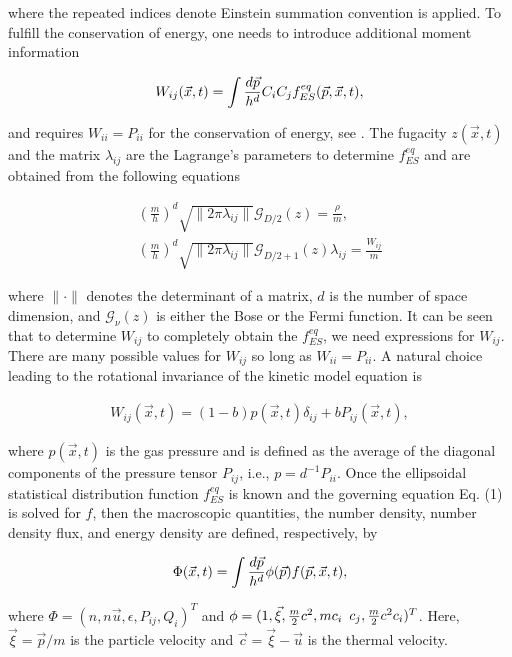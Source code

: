 \documentclass[doublecol]{epl2}
\begin{document}
where the repeated indices denote Einstein summation convention is applied. To fulfill the conservation of energy, one needs to introduce additional moment information

\begin{align}
W_{i j}(\vec x, t) = \int {d \vec p \over h^d} C_{i} C_{j} f^{eq}_{ES}(\vec p, \vec x, t),
\end{align}

and requires $W_{i i}=P_{i i}$ for the conservation of energy, see \cite{Wuetal2012}. The fugacity $z(\vec x,t)$ and the matrix $\lambda_{i j}$ are the Lagrange's parameters to determine $f^{eq}_{ES}$ and are obtained from the following equations

\begin{align}
\left(\frac{m}{h}\right)^d \sqrt{ \|2 \pi \lambda_{i j}\| } \mathcal{G}_{D/2}(z) = \frac{\rho}{m}, \\
\left(\frac{m}{h}\right)^d \sqrt{ \|2 \pi \lambda_{i j}\| } \mathcal{G}_{D/2 +1}(z) \lambda_{i j} = \frac{W_{i j}}{m}
\end{align}

where $\| \cdot \|$ denotes the determinant of a matrix, $d$ is the number of space dimension, and $\mathcal{G}_{\nu}(z)$ is either the Bose or the Fermi function. It can be seen that to determine $W_{i j} $ to completely obtain the $f^{eq}_{ES}$, we need expressions for $W_{i j} $.   There are many possible values for $W_{i j} $ so long as $W_{i i}=P_{i i}$.   A natural choice leading to the rotational invariance of the kinetic model equation is \cite{Holway1966}

\begin{align}
W_{i j}(\vec x, t) = (1 - b) p(\vec x, t) \delta_{i j} + b P_{i j}(\vec x, t),
\end{align}

where $p(\vec x, t)$ is the gas pressure and is defined as the average of the diagonal components of the pressure tensor $P_{i j}$, i.e., $p = d^{-1} P_{i i}$. Once the ellipsoidal statistical distribution function $f^{eq}_{ES}$ is known and the governing equation Eq. (1) is solved for $f$, then the macroscopic quantities, the number density, number density flux, and energy density are defined, respectively, by

\begin{align}
\Phi (\vec x, t) = \int {d \vec p \over h^d} \phi(\vec p) f(\vec p, \vec x, t),
\end{align}

where $\Phi = (n, n\vec u, \epsilon, P_{ij}, Q_{i})^T$ and $\phi = (1, \vec \xi, {m\over 2} c^2, m c_{i} $ $c_{j}, {m\over 2}c^2 c_{i} )^T$.  Here, $\vec \xi =\vec p/m$ is the particle velocity and $\vec c= \vec \xi - \vec u$ is the thermal velocity.
\end{document}
